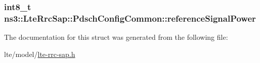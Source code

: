 \subsubsection[{\texorpdfstring{reference\+Signal\+Power}{referenceSignalPower}}]{\setlength{\rightskip}{0pt plus 5cm}int8\+\_\+t ns3\+::\+Lte\+Rrc\+Sap\+::\+Pdsch\+Config\+Common\+::reference\+Signal\+Power}\hypertarget{structns3_1_1LteRrcSap_1_1PdschConfigCommon_a605d0faa2d58cb0e7c27aa84cd455c39}{}\label{structns3_1_1LteRrcSap_1_1PdschConfigCommon_a605d0faa2d58cb0e7c27aa84cd455c39}


The documentation for this struct was generated from the following file\+:\begin{DoxyCompactItemize}
\item 
lte/model/\hyperlink{lte-rrc-sap_8h}{lte-\/rrc-\/sap.\+h}\end{DoxyCompactItemize}
